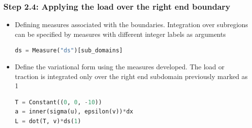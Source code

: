 \documentclass{beamer}
\begin{document}
 \begin{frame}[fragile]
\frametitle{ Step 2.4: Applying the load over the right end boundary}
\begin{itemize}
	         \vfill
	         \item{Defining measures associated with the boundaries. Integration over subregions can be specified by measures with different integer labels as arguments}
	         		\begin{lstlisting}[language=Python, basicstyle=\ttfamily\small,  keywordstyle=\color{blue}]
ds = Measure("ds")[sub_domains]
\end{lstlisting}	
		\vfill
		\item{Define the variational form using the measures developed. The load or traction is integrated only over the right end subdomain previously marked as 1}	
		\begin{lstlisting}[language=Python, basicstyle=\ttfamily\small,  keywordstyle=\color{blue}]
T = Constant((0, 0, -10))
a = inner(sigma(u), epsilon(v))*dx
L = dot(T, v)*ds(1)
\end{lstlisting}	
\end{itemize}


\end{frame}
\end{document}

